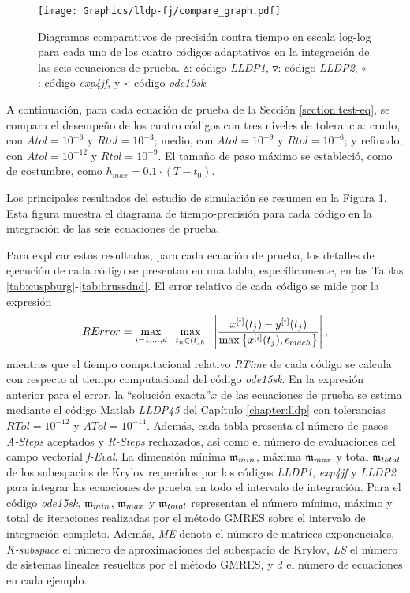 \begin{figure}
	\begin{center}
		\hspace{-0.75in}
		\texttt{[image: Graphics/lldp-fj/compare\_graph.pdf]}
		\vspace{-0.95in}
		\caption{Diagramas comparativos de precisión contra tiempo en escala log-log para cada uno de los cuatro códigos adaptativos en la integración de las seis ecuaciones de prueba. $\vartriangle$: código \emph{LLDP1}, $\triangledown$: código \emph{LLDP2}, $\circ$ : código \emph{exp4jf}, y $\square$: código \emph{ode15sk}}
		\label{lldpfj:Fig1}
	\end{center}
\end{figure}

A continuación, para cada ecuación de prueba de la Sección \ref{section:test-eq}, se compara el desempeño de los cuatro códigos con tres niveles de tolerancia: crudo, con $ Atol = 10^{-6}$ y $Rtol = 10^{-3}$; medio, con $Atol = 10^{-9}$ y $Rtol = 10^{-6}$; y refinado, con $ Atol = 10^{-12}$ y $Rtol = 10^{-9}$. El tamaño de paso máximo se estableció, como de costumbre, como $h_{max}=0\mathord{.}1\cdot(T-t_0)$.

Los principales resultados del estudio de simulación se resumen en la Figura \ref{lldpfj:Fig1}. Esta figura muestra el diagrama de tiempo-precisión para cada código en la integración de las seis ecuaciones de prueba.

Para explicar estos resultados, para cada ecuación de prueba, los detalles de ejecución de cada código se presentan en una tabla, específicamente, en las Tablas \ref{tab:cuspburg}-\ref{tab:brussdnd}. El error relativo de cada código se mide por la expresión
\begin{equation*}
	RError = \max_{i=1,\ldots,d} \;\ \max_{t_n\in(t)_h}  \;\ \left\lvert\frac{x^{[i]}(t_j)-y^{[i]}(t_j)}{\maxx{x^{[i]}(t_j),\epsilon_{mach}}}\right\rvert,
\end{equation*}
mientras que el tiempo computacional relativo \textit{RTime} de cada código se calcula con respecto al tiempo computacional del código \emph{ode15sk}. En la expresión anterior para el error, la \textquotedblleft solución exacta\textquotedblright \;$x$ de las ecuaciones de prueba se estima mediante el código Matlab \emph{LLDP45} del Capítulo \ref{chapter:lldp} con tolerancias $RTol=10^{-12}$ y $ATol=10^{-14}$. Además, cada tabla presenta el número de pasos \textit{A-Steps} aceptados y \textit{R-Steps} rechazados, así como el número de evaluaciones del campo vectorial \textit{f-Eval}. La dimensión mínima $\mathfrak{m}_ {min}$, máxima $\mathfrak{m}_ {max}$ y total $\mathfrak{m}_{total}$ de los subespacios de Krylov requeridos por los códigos \emph{LLDP1}, \emph{exp4jf} y \emph{LLDP2} para integrar las ecuaciones de prueba en todo el intervalo de integración. Para el código \emph{ode15sk}, $\mathfrak{m}_{min}$, $\mathfrak{m}_{max}$ y $\mathfrak{m}_{total}$ representan el número mínimo, máximo y total de iteraciones realizadas por el método GMRES sobre el intervalo de integración completo. Además, \textit{ME} denota el número de matrices exponenciales, \textit{K-subspace} el número de aproximaciones del subespacio de Krylov, \textit{LS} el número de sistemas lineales resueltos por el método GMRES, y $d$ el número de ecuaciones en cada ejemplo.

